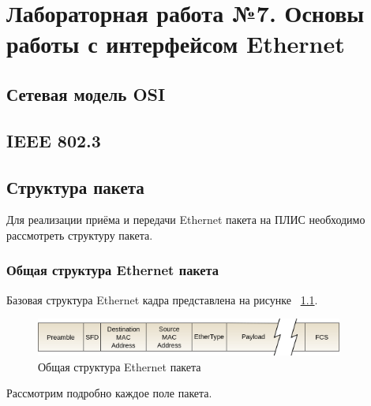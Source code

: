 \chapter{Лабораторная работа №7. Основы работы с интерфейсом Ethernet}

\section{Сетевая модель OSI}	

\section{IEEE 802.3}

\section{Структура пакета}
Для реализации приёма и передачи Ethernet пакета на ПЛИС необходимо рассмотреть структуру пакета. 

\subsection{Общая структура Ethernet пакета}

Базовая структура Ethernet кадра представлена на рисунке ~\ref{Ethernet_frame}. 

\begin{figure}[h]
	\centering
	\includegraphics[width=0.9\textwidth]{image/Ethernet_frame}
	\caption{Общая структура Ethernet пакета}
	\label{Ethernet_frame}
\end{figure}

Рассмотрим подробно каждое поле пакета.


